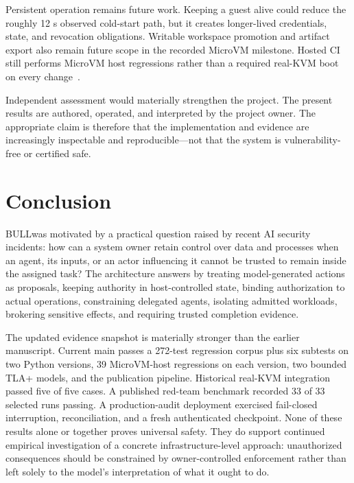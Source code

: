 \documentclass[journal]{IEEEtran}
\newcommand{\bull}{\textsc{BULL}}
\begin{document}
Persistent operation remains future work. Keeping a guest alive could reduce the roughly 12 s observed cold-start path, but it creates longer-lived credentials, state, and revocation obligations. Writable workspace promotion and artifact export also remain future scope in the recorded MicroVM milestone. Hosted CI still performs MicroVM host regressions rather than a required real-KVM boot on every change~\cite{BULL_MicroVMReport}.

Independent assessment would materially strengthen the project. The present results are authored, operated, and interpreted by the project owner. The appropriate claim is therefore that the implementation and evidence are increasingly inspectable and reproducible---not that the system is vulnerability-free or certified safe.

\section{Conclusion}
\bull was motivated by a practical question raised by recent AI security incidents: how can a system owner retain control over data and processes when an agent, its inputs, or an actor influencing it cannot be trusted to remain inside the assigned task? The architecture answers by treating model-generated actions as proposals, keeping authority in host-controlled state, binding authorization to actual operations, constraining delegated agents, isolating admitted workloads, brokering sensitive effects, and requiring trusted completion evidence.

The updated evidence snapshot is materially stronger than the earlier manuscript. Current main passes a 272-test regression corpus plus six subtests on two Python versions, 39 MicroVM-host regressions on each version, two bounded TLA+ models, and the publication pipeline. Historical real-KVM integration passed five of five cases. A published red-team benchmark recorded 33 of 33 selected runs passing. A production-audit deployment exercised fail-closed interruption, reconciliation, and a fresh authenticated checkpoint. None of these results alone or together proves universal safety. They do support continued empirical investigation of a concrete infrastructure-level approach: unauthorized consequences should be constrained by owner-controlled enforcement rather than left solely to the model's interpretation of what it ought to do.
\end{document}
